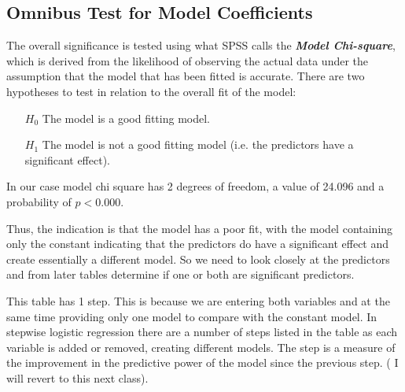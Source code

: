 \documentclass[a4paper,12pt]{article}
\begin{document}
\subsection{Omnibus Test for Model Coefficients}
The overall significance is tested using what SPSS calls the \textbf{\textit{Model Chi-square}}, which is derived from the likelihood of observing the actual data under the assumption that the model that has been fitted is accurate. There are two hypotheses to test in relation to the overall fit of the model:


 \begin{itemize}
 \item[$H_0$] The model is a good fitting model.
 \item[$H_1$] The model is not a good fitting model (i.e. the predictors have a significant effect).
 \end{itemize}
 In our case model chi square has 2 degrees of freedom, a value of 24.096 and a probability of $p < 0.000$.

Thus, the indication is that the model has a poor fit, with the model containing only the constant indicating that the predictors do have a significant effect and create essentially a different model. So we need to look closely at
the predictors and from later tables determine if one or both are significant predictors.

This table has 1 step. This is because we are entering both variables and at the same
time providing only one model to compare with the constant model. In stepwise logistic regression there are a number of steps listed in the table as each variable is added or
removed, creating different models. The step is a measure of the improvement in the
predictive power of the model since the previous step. ( I will revert to this next class).


\end{document}
